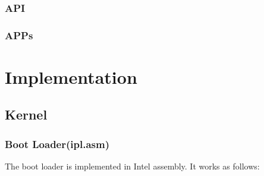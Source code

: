 \documentclass{swfcthesis}
\begin{document}
\subsection{API}
\label{sec:api}

\subsection{APPs}
\label{sec:apps-1}



\chapter{Implementation}

\section{Kernel}
\subsection{Boot Loader(ipl.asm)}

The boot loader is implemented in Intel assembly. It works as follows:
\end{document}
